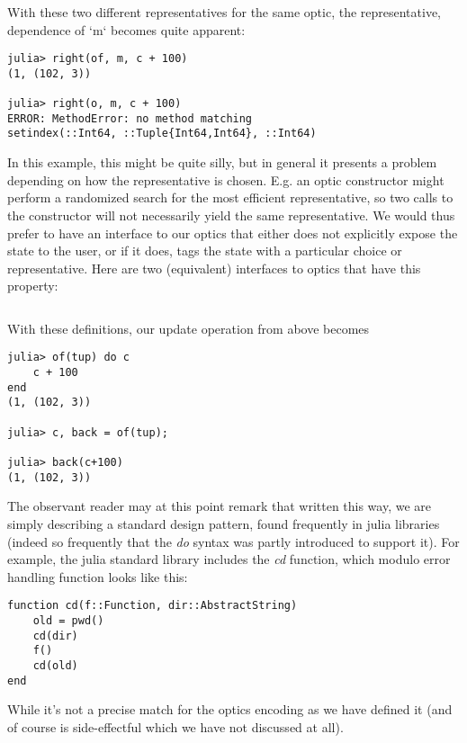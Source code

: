 \documentclass[letterpaper, 10 pt, conference]{ieeeconf}  %
\begin{document}
With these two different representatives for the same optic, the
representative, dependence of `m` becomes quite apparent:

\begin{verbatim}
julia> right(of, m, c + 100)
(1, (102, 3))

julia> right(o, m, c + 100)
ERROR: MethodError: no method matching
setindex(::Int64, ::Tuple{Int64,Int64}, ::Int64)
\end{verbatim}

In this example, this might be quite silly, but in general it presents a
problem depending on how the representative is chosen. E.g. an optic constructor
might perform a randomized search for the most efficient representative, so two
calls to the constructor will not necessarily yield the same representative. We
would thus prefer to have an interface to our optics that either does not
explicitly expose the state to the user, or if it does, tags the state with
a particular choice or representative. Here are two (equivalent) interfaces to
optics that have this property:

\inputminted[frame=lines,framesep=2mm,fontsize=\footnotesize, xleftmargin=0.5em, mathescape, linenos]{julia}{opticcall.jl}

With these definitions, our update operation from above becomes

\begin{verbatim}
julia> of(tup) do c
    c + 100
end
(1, (102, 3))

julia> c, back = of(tup);

julia> back(c+100)
(1, (102, 3))
\end{verbatim}

The observant reader may at this point remark that written this way, we are
simply describing a standard design pattern, found frequently in julia libraries
(indeed so frequently that the \textit{do} syntax was partly introduced to
support it). For example, the julia standard library includes the \textit{cd} function,
which modulo error handling function looks like this:

\begin{verbatim}
function cd(f::Function, dir::AbstractString)
    old = pwd()
    cd(dir)
    f()
    cd(old)
end
\end{verbatim}

While it's not a precise match for the optics encoding as we have defined it
(and of course is side-effectful which we have not discussed at all).
\end{document}
